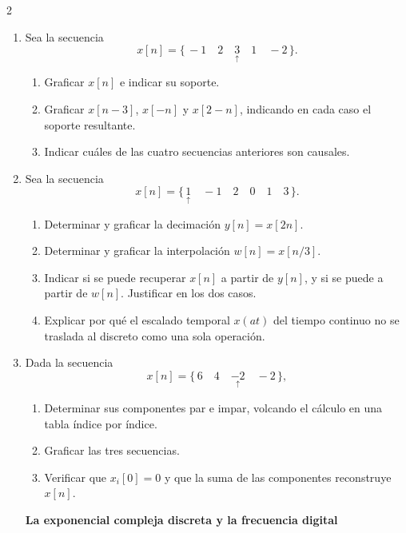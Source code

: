 \documentclass[10pt,a4paper]{article}
\begin{document}
\begin{multicols}{2}
\begin{enumerate}
		\item Sea la secuencia
		\[
			x[n] = \{\, -1 \quad 2 \quad \underset{\uparrow}{3} \quad 1 \quad -2 \,\}.
		\]
		\begin{enumerate}
			\item Graficar $x[n]$ e indicar su soporte.
			\item Graficar $x[n-3]$, $x[-n]$ y $x[2-n]$, indicando en cada caso
			el soporte resultante.
			\item Indicar cuáles de las cuatro secuencias anteriores son
			causales.
		\end{enumerate}

		\item Sea la secuencia
		\[
			x[n] = \{\, \underset{\uparrow}{1} \quad -1 \quad 2 \quad 0 \quad 1 \quad 3 \,\}.
		\]
		\begin{enumerate}
			\item Determinar y graficar la decimación $y[n] = x[2n]$.
			\item Determinar y graficar la interpolación $w[n] = x[n/3]$.
			\item Indicar si se puede recuperar $x[n]$ a partir de $y[n]$, y si
			se puede a partir de $w[n]$. Justificar en los dos casos.
			\item Explicar por qué el escalado temporal $x(at)$ del tiempo continuo no
			se traslada al discreto como una sola operación.
		\end{enumerate}

		\item Dada la secuencia
		\[
			x[n] = \{\, 6 \quad 4 \quad \underset{\uparrow}{-2} \quad -2 \,\},
		\]
		\begin{enumerate}
			\item Determinar sus componentes par e impar, volcando el cálculo
			en una tabla índice por índice.
			\item Graficar las tres secuencias.
			\item Verificar que $x_i[0] = 0$ y que la suma de las componentes
			reconstruye $x[n]$.
		\end{enumerate}

		\textbf{La exponencial compleja discreta y la frecuencia digital}


\end{enumerate}
\end{multicols}
\end{document}
